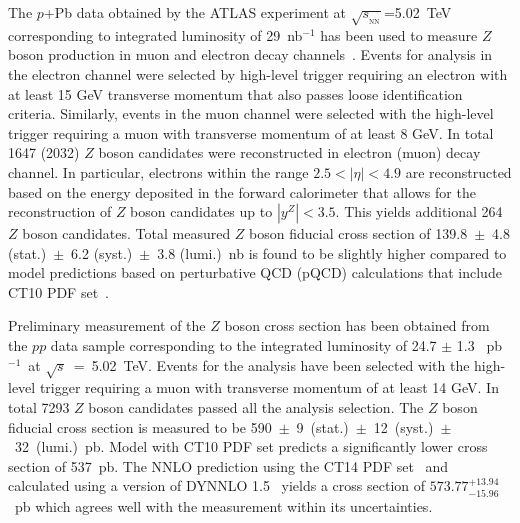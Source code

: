 \documentclass[3p,times,twocolumn]{elsarticle}
\newcommand*{\pPb}{\ensuremath{p}+Pb\xspace}
\newcommand*{\Zboson}{\ensuremath{Z}\xspace}
\newcommand*{\Wboson}{\ensuremath{W}\xspace}
\newcommand*{\pp}{\ensuremath{pp}\xspace}
\newcommand*{\sqn}{\ensuremath{\sqrt{s_{_{\mathrm{NN}}}}}\xspace}
\newcommand*{\sqs}{\ensuremath{\sqrt{s}}\xspace}
\newcommand*{\TeV}{\mbox{TeV}\xspace}
\newcommand*{\GeV}{\mbox{GeV}\xspace}
\newcommand*{\ipb}{\mbox{pb$^{-1}$}}
\newcommand*{\inb}{\mbox{nb$^{-1}$}}
\begin{document}
The \pPb data obtained by the ATLAS experiment at \sqn=5.02~TeV corresponding to integrated luminosity of 29~\inb \xspace has been used to measure \Zboson boson production in muon and electron decay channels~\cite{Aad:2015gta}. Events for analysis in the electron channel were selected by high-level trigger requiring an electron with at least 15 GeV transverse momentum that also passes loose identification criteria. Similarly, events in the muon channel were selected with the high-level trigger requiring a muon with transverse momentum of at least 8 GeV. In total 1647 (2032) \Zboson boson candidates were reconstructed in electron (muon) decay channel. In particular, electrons within the range $2.5<|\eta|<4.9$ are reconstructed based on the energy deposited in the forward calorimeter that allows for the reconstruction of \Zboson boson candidates up to $|y^{Z}|<3.5$. This yields additional 264 \Zboson boson candidates. Total measured \Zboson boson fiducial cross section of 139.8~$\pm$~4.8 (stat.)~$\pm$~6.2 (syst.)~$\pm$~3.8 (lumi.)~nb is found to be slightly higher compared to model predictions based on perturbative QCD (pQCD) calculations that include CT10 PDF set~\cite{CT10ref}. \par



Preliminary measurement of the \Zboson boson cross section has been obtained from the \pp data sample corresponding to the integrated luminosity of 24.7 $\pm$ 1.3 ~\ipb\  at  \sqs~=~5.02~\TeV. Events for the analysis have been selected with the high-level trigger requiring a muon with transverse momentum of at least 14 GeV. In total 7293 \Zboson boson candidates passed all the analysis selection. %
The \Zboson boson fiducial cross section is measured to be 590~$\pm$~9~(stat.)~$\pm$~12~(syst.)~$\pm$~32~(lumi.)~pb. Model with CT10 PDF set predicts a significantly lower cross section of 537~pb. The NNLO prediction using the CT14 PDF set~\cite{CT14ref} and calculated using a version of DYNNLO 1.5~\cite{dyn1,dyn2}  yields a cross section of $573.77^{+13.94}_{-15.96}$~pb which agrees well with the measurement within its uncertainties.  
\end{document}
